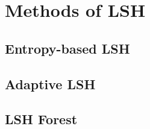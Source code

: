 \section{Methods of LSH}
\subsection{Entropy-based LSH}
\subsection{Adaptive LSH}
\subsection{LSH Forest}
